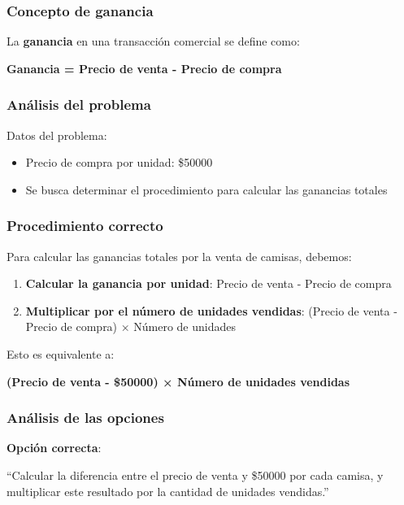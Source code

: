 \documentclass[
]{article}
\providecommand{\tightlist}{%
  \setlength{\itemsep}{0pt}\setlength{\parskip}{0pt}}
\begin{document}
\subsubsection{Concepto de ganancia}\label{concepto-de-ganancia}

La \textbf{ganancia} en una transacción comercial se define como:

\textbf{Ganancia = Precio de venta - Precio de compra}

\subsubsection{Análisis del problema}\label{anuxe1lisis-del-problema}

Datos del problema:

\begin{itemize}
\tightlist
\item
  Precio de compra por unidad: \$50000
\item
  Se busca determinar el procedimiento para calcular las ganancias
  totales
\end{itemize}

\subsubsection{Procedimiento correcto}\label{procedimiento-correcto}

Para calcular las ganancias totales por la venta de camisas, debemos:

\begin{enumerate}
\def\labelenumi{\arabic{enumi}.}
\tightlist
\item
  \textbf{Calcular la ganancia por unidad}: Precio de venta - Precio de
  compra
\item
  \textbf{Multiplicar por el número de unidades vendidas}: (Precio de
  venta - Precio de compra) × Número de unidades
\end{enumerate}

Esto es equivalente a:

\textbf{(Precio de venta - \$50000) × Número de unidades vendidas}

\subsubsection{Análisis de las
opciones}\label{anuxe1lisis-de-las-opciones}

\textbf{Opción correcta}:

``Calcular la diferencia entre el precio de venta y \$50000 por cada
camisa, y multiplicar este resultado por la cantidad de unidades
vendidas.''
\end{document}

